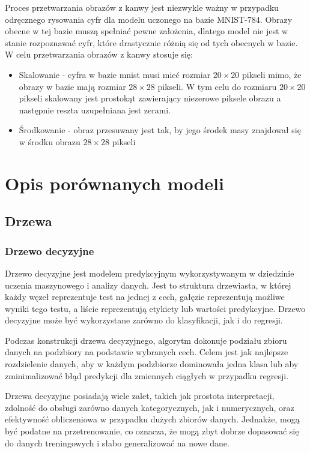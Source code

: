 \documentclass{article}
\begin{document}
Proces przetwarzania obrazów z kanwy jest niezwykle ważny
w przypadku odręcznego rysowania cyfr dla modelu uczonego
na bazie MNIST-784. Obrazy obecne w tej bazie muszą spełniać 
pewne założenia, dlatego model nie jest w stanie rozpoznawać
cyfr, które drastycznie różnią się od tych obecnych w bazie.
W celu przetwarzania obrazów z kanwy stosuje się:
\begin{itemize}
    \item Skalowanie - cyfra w bazie mnist musi mieć rozmiar $20\times20$ pikseli mimo, 
    że obrazy w bazie mają rozmiar $28\times28$ pikseli. W tym celu do rozmiaru $20\times20$ 
    pikseli skalowany jest prostokąt zawierający niezerowe piksele obrazu a następnie reszta uzupełniana jest zerami.
    \item Środkowanie - obraz przesuwany jest tak, by jego środek masy znajdował się w środku 
    obrazu $28\times28$ pikseli
\end{itemize}


\section{Opis porównanych modeli}

\subsection{Drzewa}
\subsubsection{Drzewo decyzyjne}
Drzewo decyzyjne jest modelem predykcyjnym wykorzystywanym w 
dziedzinie uczenia maszynowego i analizy danych. Jest to 
struktura drzewiasta, w której każdy węzeł reprezentuje 
test na jednej z cech, gałęzie reprezentują możliwe wyniki 
tego testu, a liście reprezentują etykiety lub wartości 
predykcyjne. Drzewo decyzyjne może być wykorzystane 
zarówno do klasyfikacji, jak i do regresji.

Podczas konstrukcji drzewa decyzyjnego, 
algorytm dokonuje podziału zbioru danych 
na podzbiory na podstawie wybranych cech. 
Celem jest jak najlepsze rozdzielenie danych, 
aby w każdym podzbiorze dominowała jedna klasa 
lub aby zminimalizować błąd predykcji dla zmiennych 
ciągłych w przypadku regresji.

Drzewa decyzyjne posiadają wiele zalet, takich jak 
prostota interpretacji, zdolność do obsługi zarówno 
danych kategorycznych, jak i numerycznych, oraz efektywność 
obliczeniowa w przypadku dużych zbiorów danych. Jednakże, 
mogą być podatne na przetrenowanie, co oznacza, że mogą zbyt 
dobrze dopasować się do danych treningowych i słabo generalizować na nowe dane.
\end{document}

